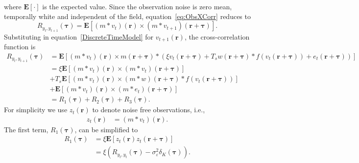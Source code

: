 \documentclass[]{article}
\begin{document}
where $\mathbf{E}[\cdot]$ is the expected value. Since the observation noise is zero mean, temporally white and independent of the field, equation~\ref{eq:ObsXCorr} reduces to
\begin{equation}
	R_{y_{t},y_{t+1}}(\boldsymbol{\tau}) = \mathbf{E}\left[ \left(m \ast v_t\right)\left(\mathbf{r}\right) \times \left(m \ast v_{t+1}\right)\left(\mathbf{r}+\boldsymbol{\tau}\right)\right].
\end{equation}
Substituting in equation~\ref{DiscreteTimeModel}  for $v_{t+1}\left(\mathbf{r}\right)$, the cross-correlation function is
\begin{align}
	R_{y_{t},y_{t+1}}(\boldsymbol{\tau}) &= \mathbf{E}\left[ \left(m \ast v_t \right)\left(\mathbf{r}\right) \times m\left(\mathbf{r}+\boldsymbol{\tau}\right) \ast \left( \xi v_t\left(\mathbf{r}+\boldsymbol{\tau}\right) + T_s w\left(\mathbf{r}+\boldsymbol{\tau}\right) \ast f\left(v_t\left(\mathbf{r}+\boldsymbol{\tau}\right)\right) + e_t\left(\mathbf{r}+\boldsymbol{\tau}\right)\right) \right] \nonumber \\	
	 &= \xi \mathbf{E}\left[ \left(m \ast v_t \right)\left(\mathbf{r}\right) \times \left(m \ast v_t\right)\left(\mathbf{r}+\boldsymbol{\tau}\right)\right] \nonumber \\
	&+ T_s\mathbf{E}\left[\left(m \ast v_t \right)\left(\mathbf{r}\right) \times \left(m \ast w \right)\left(\mathbf{r}+\boldsymbol{\tau}\right) \ast f\left(v_t\left(\mathbf{r}+\boldsymbol{\tau}\right)\right) \right] \nonumber \\
	&+ \mathbf{E}\left[ \left(m \ast v_t \right)\left(\mathbf{r}\right)  \times \left(m \ast e_t\right)\left(\mathbf{r}+\boldsymbol{\tau}\right)\right] \nonumber \\
	&= R_1(\boldsymbol{\tau}) + R_2(\boldsymbol{\tau}) + R_3(\boldsymbol{\tau}).\label{eq:spatialxcorr} 
\end{align}
For simplicity we use $z_{t}\left(\mathbf{r}\right)$ to denote noise free observations, i.e.,
\begin{align}
z_{t}\left(\mathbf r\right)&=\left(m\ast v_{t}\right)\left(\mathbf{r}\right). 
\end{align}
The first term, $R_1(\boldsymbol{\tau})$, can be simplified to
\begin{align}
	R_1(\boldsymbol{\tau}) &= \xi \mathbf{E}\left[z_{t}\left(\mathbf r\right)  z_{t}\left(\mathbf{r}+\boldsymbol{\tau}\right) \right] \\
	&= \xi\left( R_{y_{t},y_{t}}(\boldsymbol{\tau}) - \sigma_{\varepsilon}^2\delta_K\left(\boldsymbol{\tau}\right) \right). \label{eq:R1}
\end{align}
\end{document}
